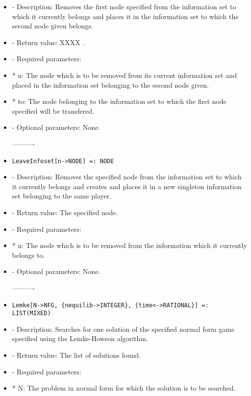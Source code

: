 \begin{itemize}
\bd
\item
- Description:  Removes the first node specified from the information set
to which it currently belongs and places it in the information set to
which the second node given belongs.
\item
- Return value:  XXXX .
\item
- Required parameters:
	  
\bd
\item
*  n:  The node which is to be removed from its current information
set and placed in the information set belonging to the second
node given.
\item
*  to:  The node belonging to the information set to which the first
node specified will be transfered.
\ed

\item
- Optional parameters:  None.
\ed

----------
\item
\begin{verbatim}
LeaveInfoset[n->NODE] =: NODE
\end{verbatim}

\bd
\item
- Description:  Removes the specified node from the information set to
which it currently belongs and creates and places it in a new singleton
information set belonging to the same player.
\item
- Return value:  The specified node.
\item
- Required parameters:
	  
\bd
\item
*  n:  The node which is to be removed from the information which it
currently belongs to.
\ed

\item
- Optional parameters:  None.
\ed

----------
\item
\begin{verbatim}
Lemke[N->NFG, {nequilib->INTEGER}, {time<->RATIONAL}] =: LIST(MIXED)
\end{verbatim}

\bd
\item
- Description:  Searches for one solution of the specified normal form 
game specified using the Lemke-Howson algorithm.  
\item
- Return value:  The list of solutions found.
\item
- Required parameters:

\bd
\item
*  N:  The problem in normal form for which the solution is to be 
searched.
\ed


\end{itemize}
